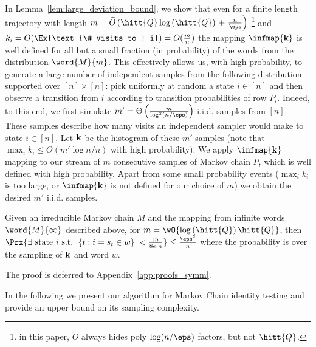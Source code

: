 In Lemma~\ref{lem:large_deviation_bound}, we show that even for a finite length trajectory with length $ m=\widetilde{O}\left(\hitt{Q}\log\left(\hitt{Q}\right)\right. \allowbreak +\left. \frac{n}{\eps}\right)$ \footnote{in this paper, $\widetilde{O}$ always hides poly $\log(n/\eps)$ factors, but not $\hitt{Q}$.} and 
$k_i=O(\Ex{\text{\# visits to } i})=O(\frac{m}{n})$ the mapping $\infmap{\vect{k}}$ is well defined for all 
but a small fraction (in probability) of the words from the distribution $\word{M}{m}$. This effectively allows us, with high probability, to generate a large number of independent samples from the following distribution supported over $[n]\times[n]$: pick uniformly at random a state $i\in[n]$ and then observe a transition from $i$ according to transition probabilities of row $P_i$.
Indeed, to this end, we first simulate $m'=\Theta\left(\frac{m}{\log^2 (n/\eps)}\right)$ i.i.d. samples from $[n]$. These samples describe how many visits an independent sampler would make to state $i \in [n]$. Let 
$\mathbf{k}$ be the histogram of these $m'$ samples (note that $\max_{i} k_i \le O(m'\log n /n)$ with high probability). 
We apply $\infmap{\vect{k}}$ mapping to our stream of $m$ consecutive samples of Markov chain $P$, which is well defined with high probability. 
Apart from some small probability events ($\max_{i} k_i$ is too large, or $\infmap{\vect{k}}$ is not defined for our choice of $m$) we obtain the desired $m'$ i.i.d. 
samples. 
\begin{lemma}
	Given an irreducible Markov chain $M$ and the mapping from infinite words $\word{M}{\infty}$ described above, for $m=\wO{\log\left(\hitt{Q}\right)\hitt{Q}}$, then 
	$\Prx{\exists~\text{state}~i~\text{s.t.}~|\{t: i=s_t\in w\}|<\frac{m}{8e\cdot n}}\le\frac{\eps^2}{n}$ where the probability is over the sampling of $\mathbf{k}$ and word $w$. 
\label{lem:large_deviation_bound}
\end{lemma}
The proof is deferred to Appendix~\ref{app:proofs_symm}.


In the following we present our algorithm for Markov Chain identity testing and provide an upper bound on its sampling complexity.

